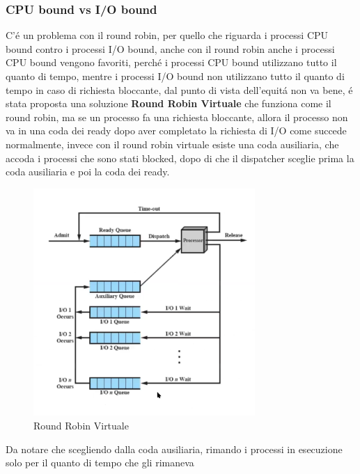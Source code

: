 \documentclass[11pt]{article}
\begin{document}
    \subsubsection*{CPU bound vs I/O bound}
    C'é un problema con il round robin, per quello che riguarda i processi CPU bound contro i processi I/O bound,
    anche con il round robin anche i processi CPU bound vengono favoriti, perché i processi CPU bound utilizzano
    tutto il quanto di tempo, mentre i processi I/O bound non utilizzano tutto il quanto di tempo in caso di richiesta
    bloccante, dal punto di vista dell'equitá non va bene, é stata proposta una soluzione \textbf{Round Robin Virtuale}
    che funziona come il round robin, ma se un processo fa una richiesta bloccante, allora il processo non va in una coda
    dei ready dopo aver completato la richiesta di I/O come succede normalmente, invece con il round robin virtuale
    esiste una coda ausiliaria, che accoda i processi che sono stati blocked, dopo di che il dispatcher sceglie prima
    la coda ausiliaria e poi la coda dei ready.
    \begin{figure}
        \centering
        \includegraphics[width=0.75\textwidth]{immagini/RoundRobinVirtuale}
        \caption{Round Robin Virtuale}
    \end{figure}
    Da notare che scegliendo dalla coda ausiliaria, rimando i processi in esecuzione solo per il quanto di tempo che gli rimaneva
\end{document}
